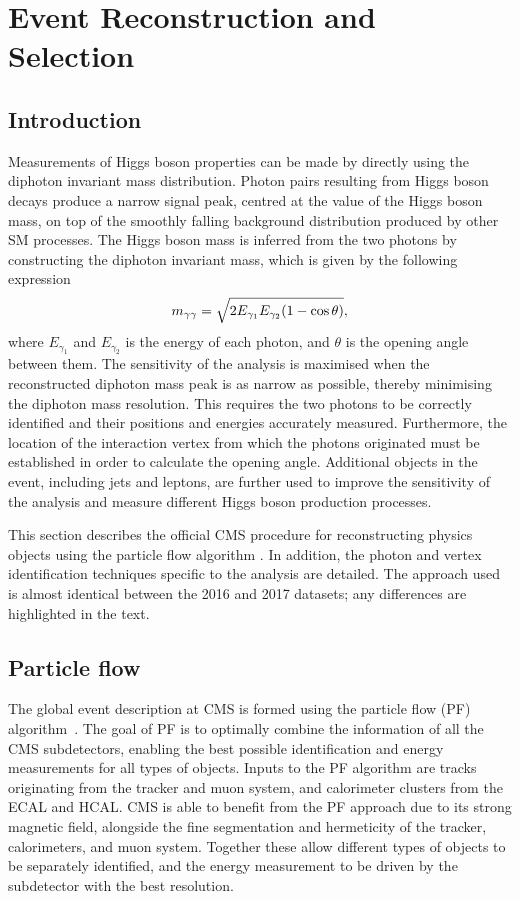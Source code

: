 \chapter{Event Reconstruction and Selection}
\label{chap:objects}

\section{Introduction}

Measurements of Higgs boson properties can be made 
by directly using the diphoton invariant mass distribution.
Photon pairs resulting from Higgs boson decays produce a narrow signal peak, 
centred at the value of the Higgs boson mass, 
on top of the smoothly falling background distribution produced by other SM processes.
The Higgs boson mass is inferred from the two photons by constructing the diphoton invariant mass, 
which is given by the following expression
\begin{equation}
\label{eq:obj_mgg}
m_{\gamma\gamma} = \sqrt{ 2 E_{\gamma_1} E_{\gamma_2} (1 - \cos{\theta}) } ,
\end{equation}
where $E_{\gamma_1}$ and $E_{\gamma_2}$ is the energy of each photon, 
and $\theta$ is the opening angle between them.
The sensitivity of the analysis is maximised 
when the reconstructed diphoton mass peak is as narrow as possible, 
thereby minimising the diphoton mass resolution.
This requires the two photons to be correctly identified 
and their positions and energies accurately measured.
Furthermore, the location of the interaction vertex from which the photons originated 
must be established in order to calculate the opening angle.
Additional objects in the event, including jets and leptons, 
are further used to improve the sensitivity of the analysis 
and measure different Higgs boson production processes.

This section describes the official CMS procedure for reconstructing physics objects using the particle flow algorithm \cite{ParticleFlow}.
In addition, the photon and vertex identification techniques specific to the \Hgg analysis are detailed.
The approach used is almost identical between the 2016 and 2017 datasets; 
any differences are highlighted in the text.

\section{Particle flow}
The global event description at CMS is formed using the particle flow (PF) algorithm~\cite{ParticleFlow}.
The goal of PF is to optimally combine the information of all the CMS subdetectors, 
enabling the best possible identification and energy measurements for all types of objects.
Inputs to the PF algorithm are tracks originating from the tracker and muon system, 
and calorimeter clusters from the ECAL and HCAL.
CMS is able to benefit from the PF approach due to its strong magnetic field, 
alongside the fine segmentation and hermeticity of the tracker, calorimeters, and muon system.
Together these allow different types of objects to be separately identified, 
and the energy measurement to be driven by the subdetector with the best resolution.

